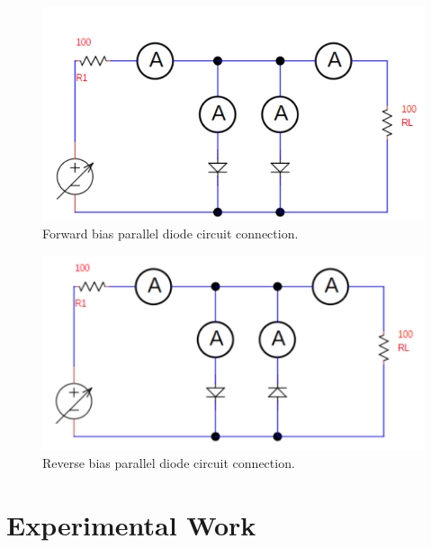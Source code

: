 \begin{figure}[H]
    \centering
    \includegraphics[scale=0.3]{src/exp03/fig3.png}
    \caption{Forward bias parallel diode circuit connection.}
\end{figure}

\begin{figure}[H]
    \centering
    \includegraphics[scale=0.3]{src/exp03/fig4.png}
    \caption{Reverse bias parallel diode circuit connection.}
\end{figure}

\section{Experimental Work}
